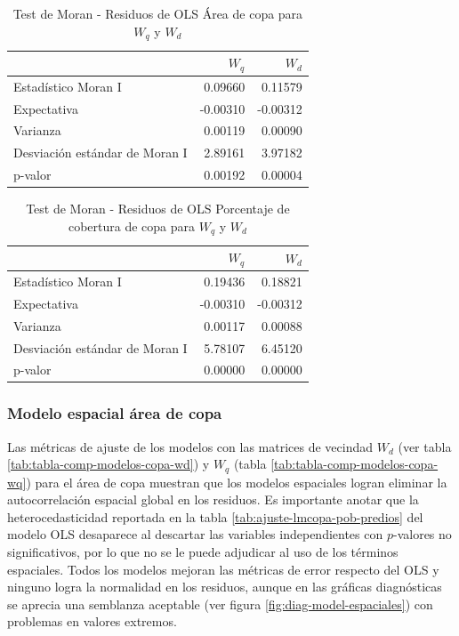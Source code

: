 \documentclass[12pt,a4paper,openany]{book}
\theoremstyle{definition}
\theoremstyle{definition}
\theoremstyle{definition}
\theoremstyle{remark}
\begin{document}
\begin{table}[H]

\caption{\label{tab:moran-rescopa-w}Test de Moran - Residuos de OLS Área de copa para $W_q$ y $W_d$}
\centering
\begin{tabular}{lrr}
\toprule
  & $W_q$ & $W_d$\\
\midrule
Estadístico Moran I & 0.09660 & 0.11579\\
Expectativa & -0.00310 & -0.00312\\
Varianza & 0.00119 & 0.00090\\
Desviación estándar de Moran I & 2.89161 & 3.97182\\
p-valor & 0.00192 & 0.00004\\
\bottomrule
\end{tabular}
\end{table}

\begin{table}[H]

\caption{\label{tab:moran-rescopaap-w}Test de Moran - Residuos de OLS Porcentaje de cobertura de copa para $W_q$ y $W_d$}
\centering
\begin{tabular}{lrr}
\toprule
  & $W_q$ & $W_d$\\
\midrule
Estadístico Moran I & 0.19436 & 0.18821\\
Expectativa & -0.00310 & -0.00312\\
Varianza & 0.00117 & 0.00088\\
Desviación estándar de Moran I & 5.78107 & 6.45120\\
p-valor & 0.00000 & 0.00000\\
\bottomrule
\end{tabular}
\end{table}

\subsubsection{Modelo espacial área de
copa}\label{modelo-espacial-uxe1rea-de-copa}

Las métricas de ajuste de los modelos con las matrices de vecindad
\(W_d\) (ver tabla \ref{tab:tabla-comp-modelos-copa-wd}) y \(W_q\)
(tabla \ref{tab:tabla-comp-modelos-copa-wq}) para el área de copa
muestran que los modelos espaciales logran eliminar la autocorrelación
espacial global en los residuos. Es importante anotar que la
heterocedasticidad reportada en la tabla
\ref{tab:ajuste-lmcopa-pob-predios} del modelo OLS desaparece al
descartar las variables independientes con \(p\)-valores no
significativos, por lo que no se le puede adjudicar al uso de los
términos espaciales. Todos los modelos mejoran las métricas de error
respecto del OLS y ninguno logra la normalidad en los residuos, aunque
en las gráficas diagnósticas se aprecia una semblanza aceptable (ver
figura \ref{fig:diag-model-espaciales}) con problemas en valores
extremos.
\end{document}
